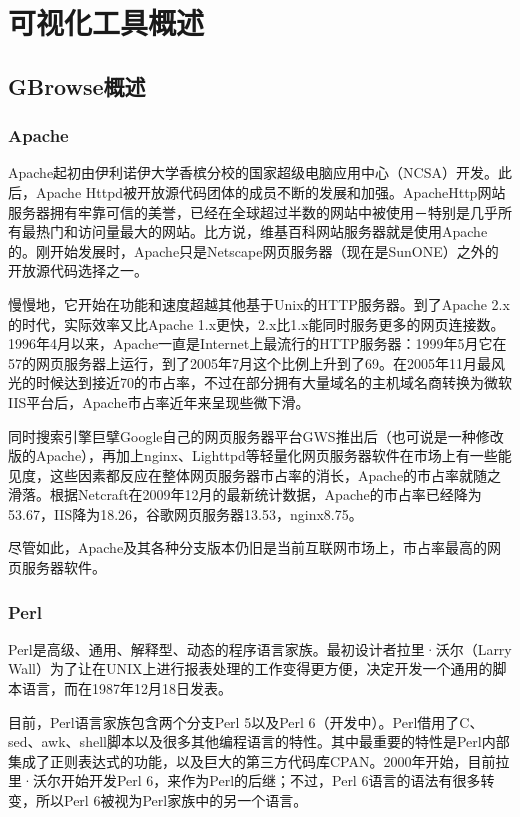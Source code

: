 \chapter{可视化工具概述}
	\section{GBrowse概述}
		\subsection{Apache}
		Apache起初由伊利诺伊大学香槟分校的国家超级电脑应用中心（NCSA）开发。此后，Apache Httpd被开放源代码团体的成员不断的发展和加强。ApacheHttp网站服务器拥有牢靠可信的美誉，已经在全球超过半数的网站中被使用－特别是几乎所有最热门和访问量最大的网站。比方说，维基百科网站服务器就是使用Apache的。刚开始发展时，Apache只是Netscape网页服务器（现在是SunONE）之外的开放源代码选择之一。
		
		慢慢地，它开始在功能和速度超越其他基于Unix的HTTP服务器。到了Apache 2.x的时代，实际效率又比Apache 1.x更快，2.x比1.x能同时服务更多的网页连接数。1996年4月以来，Apache一直是Internet上最流行的HTTP服务器：1999年5月它在57的网页服务器上运行，到了2005年7月这个比例上升到了69。在2005年11月最风光的时候达到接近70的市占率，不过在部分拥有大量域名的主机域名商转换为微软IIS平台后，Apache市占率近年来呈现些微下滑。
		
		同时搜索引擎巨擘Google自己的网页服务器平台GWS推出后（也可说是一种修改版的Apache），再加上nginx、Lighttpd等轻量化网页服务器软件在市场上有一些能见度，这些因素都反应在整体网页服务器市占率的消长，Apache的市占率就随之滑落。根据Netcraft在2009年12月的最新统计数据，Apache的市占率已经降为53.67，IIS降为18.26，谷歌网页服务器13.53，nginx8.75。
		
		尽管如此，Apache及其各种分支版本仍旧是当前互联网市场上，市占率最高的网页服务器软件。
		\subsection{Perl}
		Perl是高级、通用、解释型、动态的程序语言家族。最初设计者拉里·沃尔（Larry Wall）为了让在UNIX上进行报表处理的工作变得更方便，决定开发一个通用的脚本语言，而在1987年12月18日发表。
		
		目前，Perl语言家族包含两个分支Perl 5以及Perl 6（开发中）。Perl借用了C、sed、awk、shell脚本以及很多其他编程语言的特性。其中最重要的特性是Perl内部集成了正则表达式的功能，以及巨大的第三方代码库CPAN。2000年开始，目前拉里·沃尔开始开发Perl 6，来作为Perl的后继；不过，Perl 6语言的语法有很多转变，所以Perl 6被视为Perl家族中的另一个语言。
		
